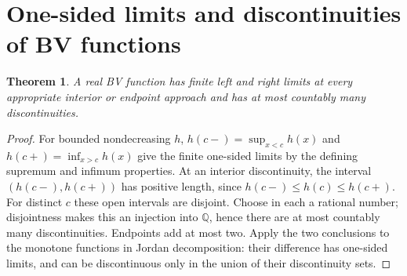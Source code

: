 \documentclass[11pt,oneside,a4paper]{book}
\newtheorem{theorem}{Theorem}[chapter]
\theoremstyle{definition}
\theoremstyle{remark}
\newcommand{\Q}{\mathbb Q}
\newcommand{\KEntry}[2]{\Needspace{7\baselineskip}\section{#2}\label{#1}{\small\sffamily\color{black!60}\detokenize{#1}}\par}
\begin{document}
\KEntry{K03.15.one_sided}{One-sided limits and discontinuities of BV functions}
\begin{theorem}
A real BV function has finite left and right limits at every appropriate interior or endpoint approach and has at most countably many discontinuities.
\end{theorem}
\begin{proof}
For bounded nondecreasing $h$, $h(c-)=\sup_{x<c}h(x)$ and $h(c+)=\inf_{x>c}h(x)$ give the finite one-sided limits by the defining supremum and infimum properties. At an interior discontinuity, the interval $(h(c-),h(c+))$ has positive length, since $h(c-)\leq h(c)\leq h(c+)$. For distinct $c$ these open intervals are disjoint. Choose in each a rational number; disjointness makes this an injection into $\Q$, hence there are at most countably many discontinuities. Endpoints add at most two. Apply the two conclusions to the monotone functions in Jordan decomposition: their difference has one-sided limits, and can be discontinuous only in the union of their discontinuity sets.
\end{proof}
\end{document}
